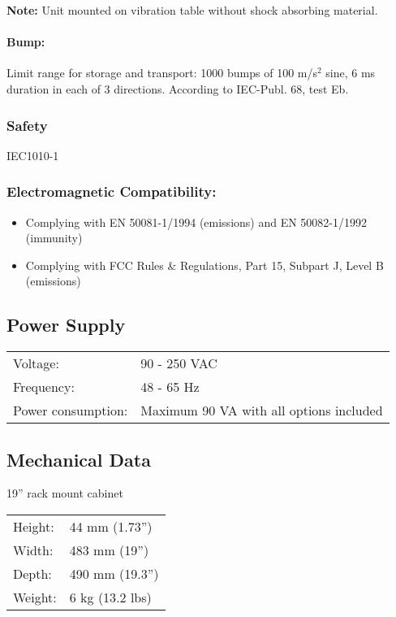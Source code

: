 \textbf{Note:} Unit mounted on vibration table without shock absorbing material.

\paragraph{Bump:}
Limit range for storage and transport:
1000 bumps of 100 m/s$^2$
sine, 6 ms duration in each of 3 directions.
According to IEC-Publ. 68, test Eb.

\subsubsection{Safety}
IEC1010-1

\subsubsection{Electromagnetic Compatibility:}
\begin{itemize}
\item Complying with EN 50081-1/1994 (emissions) and EN 50082-1/1992 (immunity)
\item Complying with FCC Rules \& Regulations, Part 15, Subpart J, Level B (emissions)
\end{itemize}

\subsection{Power Supply}
\begin{tabular}{l l}
Voltage: 						& 90 - 250 VAC \\
Frequency: 					& 48 - 65 Hz \\
Power consumption: 	& Maximum 90 VA with all options included \\
\end{tabular}

\subsection{Mechanical Data}
19'' rack mount cabinet

\begin{tabular}{l l}
Height:		& 44 mm (1.73'') \\
Width: 		& 483 mm (19'') \\
Depth:		& 490 mm (19.3'') \\
Weight:		& 6 kg (13.2 lbs) \\
\end{tabular}